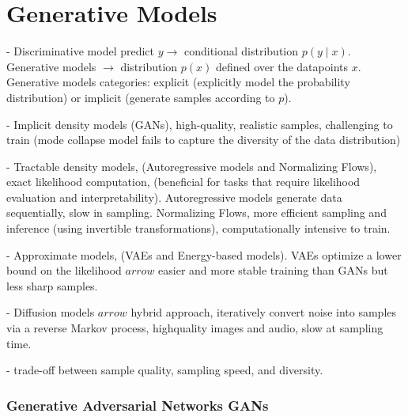 \section{Generative Models}


- Discriminative model predict $y \rightarrow$ conditional distribution $p(y \mid x)$. Generative models $\rightarrow$ distribution $p(x)$ defined over the datapoints $x$. Generative models  categories: explicit (explicitly model the probability distribution) or implicit (generate samples according to $p$).




- Implicit density models (GANs), high-quality, realistic samples, challenging to train (mode collapse model fails to capture the diversity of the data distribution)

- Tractable density models, (Autoregressive models and Normalizing Flows), exact likelihood computation, (beneficial for tasks that require likelihood evaluation and interpretability). Autoregressive models generate data sequentially, slow in sampling. Normalizing Flows, more efficient sampling and inference (using invertible transformations), computationally intensive to train.

- Approximate models, (VAEs and Energy-based models). VAEs optimize a lower bound on the likelihood $arrow$ easier and more stable training than GANs but less sharp samples.

- Diffusion models $arrow$ hybrid approach, iteratively convert noise into samples via a reverse Markov process, highquality images and audio, slow at sampling time.


- trade-off between sample quality, sampling speed, and diversity.





\subsubsection*{Generative Adversarial Networks GANs}

